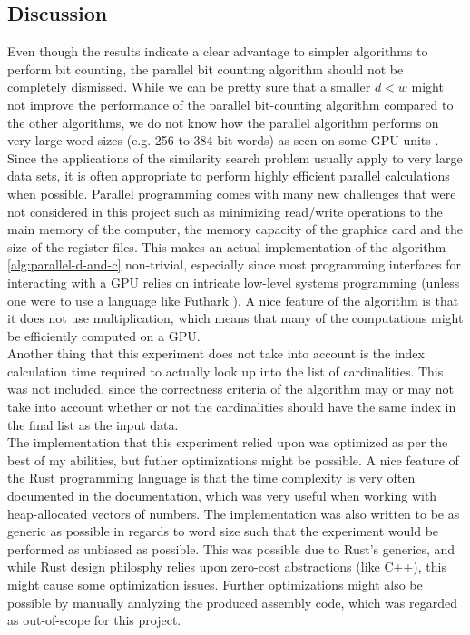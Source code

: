 \subsection{Discussion}
Even though the results indicate a clear advantage to simpler algorithms to perform bit counting, the parallel bit counting algorithm should not be completely dismissed. While we can be pretty sure that a smaller $d < w$ might not improve the performance of the parallel bit-counting algorithm compared to the other algorithms, we do not know how the parallel algorithm performs on very large word sizes (e.g. 256 to 384 bit words) as seen on some GPU units \cite{techpowerup}. Since the applications of the similarity search problem usually apply to very large data sets, it is often appropriate to perform highly efficient parallel calculations when possible. 
Parallel programming comes with many new challenges that were not considered in this project such as minimizing read/write operations to the main memory of the computer, the memory capacity of the graphics card and the size of the register files. 
This makes an actual implementation of the algorithm \ref{alg:parallel-d-and-c} non-trivial, especially since most programming interfaces for interacting with a GPU relies on intricate low-level systems programming (unless one were to use a language like Futhark \cite{futhark}). A nice feature of the algorithm is that it does not use multiplication, which means that many of the computations might be efficiently computed on a GPU.\\
Another thing that this experiment does not take into account is the index calculation time required to actually look up into the list of cardinalities. This was not included, since the correctness criteria of the algorithm may or may not take into account whether or not the cardinalities should have the same index in the final list as the input data.\\
The implementation that this experiment relied upon was optimized as per the best of my abilities, but futher optimizations might be possible. A nice feature of the Rust programming language is that the time complexity is very often documented in the documentation, which was very useful when working with heap-allocated vectors of numbers. The implementation was also written to be as generic as possible in regards to word size such that the experiment would be performed as unbiased as possible. This was possible due to Rust's generics, and while Rust design philosphy relies upon zero-cost abstractions \cite{rust-lang} (like C++), this might cause some optimization issues. Further optimizations might also be possible by manually analyzing the produced assembly code, which was regarded as out-of-scope for this project.\\

